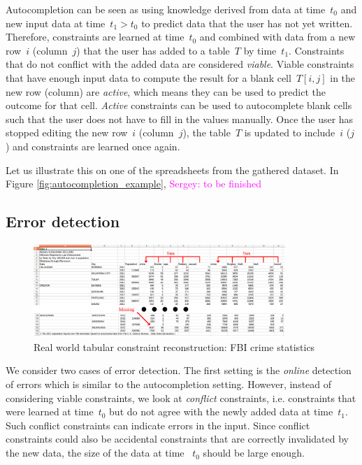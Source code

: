 \documentclass{sig-alternate-05-2015}
\newcommand{\sergey}[1]{\textcolor{magenta}{{\sc Sergey:} #1}\xspace}
\begin{document}
Autocompletion can be seen as using knowledge derived from data at time~$t_0$ and new input data at time~$t_1 > t_0$ to predict data that the user has not yet written.
Therefore, constraints are learned at time~$t_0$ and combined with data from a new row~$i$ (column~$j$) that the user has added to a table~$T$ by time~$t_1$.
Constraints that do not conflict with the added data are considered \textit{viable}.
Viable constraints that have enough input data to compute the result for a blank cell~$T[i,j]$ in the new row (column) are \textit{active}, which means they can be used to predict the outcome for that cell.
\textit{Active} constraints can be used to autocomplete blank cells such that the user does not have to fill in the values manually.
Once the user has stopped editing the new row~$i$ (column~$j$), the table~$T$ is updated to include~$i$ ($j$) and constraints are learned once again.

Let us illustrate this on one of the spreadsheets from the gathered dataset. In Figure \ref{fig:autocompletion_example}, \sergey{to be finished}


\subsection{Error detection}
\begin{figure}[thb]
  \begin{center}
    \includegraphics[width=0.85\textwidth]{figures/fbi_figure_highlighted.png}
  \end{center}
  \caption{Real world tabular constraint reconstruction: FBI crime statistics}
  \label{fig:fbi}
\end{figure}


We consider two cases of error detection.
The first setting is the \textit{online} detection of errors which is similar to the autocompletion setting.
However, instead of considering viable constraints, we look at \textit{conflict} constraints, i.e. constraints that were learned at time~$t_0$ but do not agree with the newly added data at time~$t_1$.
Such conflict constraints can indicate errors in the input.
Since conflict constraints could also be accidental constraints that are correctly invalidated by the new data, the size of the data at time ~$t_0$ should be large enough.
\end{document}
